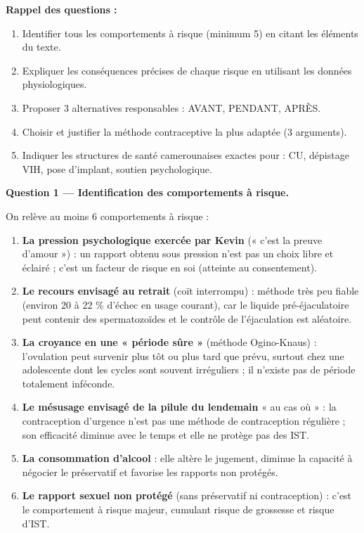 \documentclass[11pt]{article}
\begin{document}
\begin{exoresolu}
\textbf{Rappel des questions :}
\begin{enumerate}
\item Identifier tous les comportements à risque (minimum 5) en citant les éléments du texte.
\item Expliquer les conséquences précises de chaque risque en utilisant les données physiologiques.
\item Proposer 3 alternatives responsables : AVANT, PENDANT, APRÈS.
\item Choisir et justifier la méthode contraceptive la plus adaptée (3 arguments).
\item Indiquer les structures de santé camerounaises exactes pour : CU, dépistage VIH, pose d'implant, soutien psychologique.
\end{enumerate}

\tcblower

\textbf{Question 1 — Identification des comportements à risque.}

On relève au moins 6 comportements à risque :
\begin{enumerate}
\item \textbf{La pression psychologique exercée par Kevin} (« c'est la preuve d'amour ») : un rapport obtenu sous pression n'est pas un choix libre et éclairé ; c'est un facteur de risque en soi (atteinte au consentement).
\item \textbf{Le recours envisagé au retrait} (coït interrompu) : méthode très peu fiable (environ 20 à 22 \% d'échec en usage courant), car le liquide pré-éjaculatoire peut contenir des spermatozoïdes et le contrôle de l'éjaculation est aléatoire.
\item \textbf{La croyance en une « période sûre »} (méthode Ogino-Knaus) : l'ovulation peut survenir plus tôt ou plus tard que prévu, surtout chez une adolescente dont les cycles sont souvent irréguliers ; il n'existe pas de période totalement inféconde.
\item \textbf{Le mésusage envisagé de la pilule du lendemain} « au cas où » : la contraception d'urgence n'est pas une méthode de contraception régulière ; son efficacité diminue avec le temps et elle ne protège pas des IST.
\item \textbf{La consommation d'alcool} : elle altère le jugement, diminue la capacité à négocier le préservatif et favorise les rapports non protégés.
\item \textbf{Le rapport sexuel non protégé} (sans préservatif ni contraception) : c'est le comportement à risque majeur, cumulant risque de grossesse et risque d'IST.
\end{enumerate}


\end{exoresolu}
\end{document}
